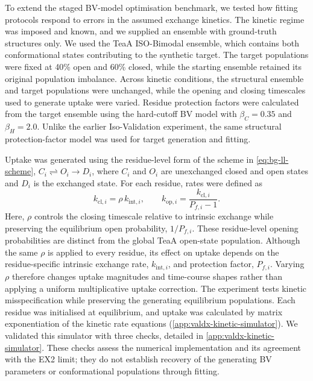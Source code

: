 To extend the staged BV-model optimisation benchmark, we tested how fitting protocols respond to errors in the assumed exchange kinetics. The kinetic regime was imposed and known, and we supplied an ensemble with ground-truth structures only. We used the TeaA ISO-Bimodal ensemble, which contains both conformational states contributing to the synthetic target. The target populations were fixed at 40\% open and 60\% closed, while the starting ensemble retained its original population imbalance. Across kinetic conditions, the structural ensemble and target populations were unchanged, while the opening and closing timescales used to generate uptake were varied. Residue protection factors were calculated from the target ensemble using the hard-cutoff BV model with $\beta_C=0.35$ and $\beta_H=2.0$. Unlike the earlier Iso-Validation experiment, the same structural protection-factor model was used for target generation and fitting.

Uptake was generated using the residue-level form of the scheme in \cref{eq:bg-ll-scheme}, $C_i\rightleftharpoons O_i\rightarrow D_i$, where $C_i$ and $O_i$ are unexchanged closed and open states and $D_i$ is the exchanged state. For each residue, rates were defined as
\begin{equation}
    k_{\text{cl},i}=\rho\,k_{\text{int},i},
    \qquad
    k_{\text{op},i}=\frac{k_{\text{cl},i}}{P_{f,i}-1}.
    \label{eq:valdx-kinetic-rates}
\end{equation}
Here, $\rho$ controls the closing timescale relative to intrinsic exchange while preserving the equilibrium open probability, $1/P_{f,i}$. These residue-level opening probabilities are distinct from the global TeaA open-state population. Although the same $\rho$ is applied to every residue, its effect on uptake depends on the residue-specific intrinsic exchange rate, $k_{\text{int},i}$, and protection factor, $P_{f,i}$. Varying $\rho$ therefore changes uptake magnitudes and time-course shapes rather than applying a uniform multiplicative uptake correction. The experiment tests kinetic misspecification while preserving the generating equilibrium populations. Each residue was initialised at equilibrium, and uptake was calculated by matrix exponentiation of the kinetic rate equations (\cref{app:valdx-kinetic-simulator}). We validated this simulator with three checks, detailed in \cref{app:valdx-kinetic-simulator}. These checks assess the numerical implementation and its agreement with the EX2 limit; they do not establish recovery of the generating BV parameters or conformational populations through fitting.

